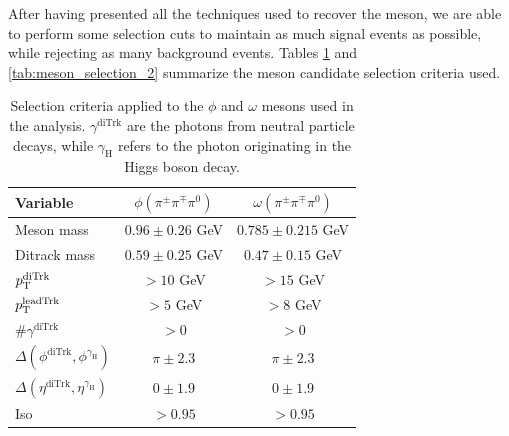 After having presented all the techniques used to recover the meson, we are able to perform some selection cuts to maintain as much signal events as possible, while rejecting as many background events. Tables \ref{tab:meson_selection_1} and \ref{tab:meson_selection_2} summarize the meson candidate selection criteria used.
\begin{table}[!ht]
    \centering
    \begin{tabular}{|l|c|c|}
        \hline
        \cellcolor{lightgray}Variable & \cellcolor{lightgray}$\phi(\pi^{\pm}\pi^{\mp}\pi^{0})$ & \cellcolor{lightgray}$\omega(\pi^{\pm}\pi^{\mp}\pi^{0})$ \\ \hline
        Meson mass                                              &$0.96\pm0.26$ GeV  &$0.785\pm0.215$ GeV    \\
        Ditrack mass                                            &$0.59\pm0.25$ GeV  &$0.47\pm0.15$ GeV      \\
        $p_\text{T}^{\text{diTrk}}$                                    &$>10$ GeV          &$>15$ GeV              \\
        $p_\text{T}^{\text{leadTrk}}$                                  &$>5$ GeV           &$>8$ GeV               \\
        $\#\gamma^{\text{diTrk}}$                               &$>0$               &$>0$                   \\
        $\Delta(\phi^{\text{diTrk}}, \phi^{\gamma_\text{H}})$   &$\pi\pm2.3$    &$\pi\pm2.3$        \\
        $\Delta(\eta^{\text{diTrk}}, \eta^{\gamma_\text{H}})$   &$0\pm1.9$          &$0\pm1.9$              \\
        Iso                                                     &$>0.95$            &$>0.95$                \\
        \hline
        \end{tabular}
    \caption{Selection criteria applied to the $\phi$ and $\omega$ mesons used in the analysis. $\gamma^{\text{diTrk}}$ are the photons from neutral particle decays, while $\gamma_\text{H}$ refers to the photon originating in the Higgs boson decay.}
    \label{tab:meson_selection_1}
\end{table}

